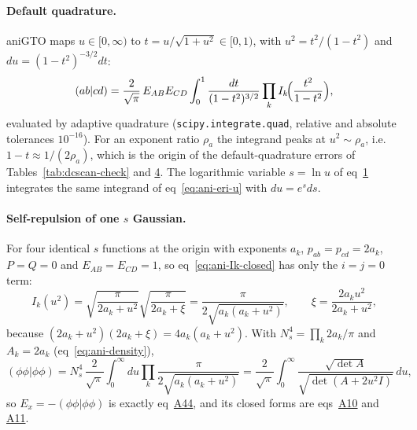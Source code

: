 \documentclass[journal=jctcce,manuscript=suppinfo]{achemso}
\begin{document}
\paragraph{Default quadrature.}  aniGTO maps $u\in[0,\infty)$ to
$t=u/\sqrt{1+u^2}\in[0,1)$, with $u^2=t^2/(1-t^2)$ and
$du=(1-t^2)^{-3/2}dt$:
\begin{equation}
(ab|cd)=\frac{2}{\sqrt\pi}\,E_{AB}E_{CD}\int_0^1\frac{dt}{(1-t^2)^{3/2}}
\prod_kI_k\!\Bigl(\frac{t^2}{1-t^2}\Bigr),
\label{eq:ani-eri-t}
\end{equation}
evaluated by adaptive quadrature (\texttt{scipy.integrate.quad}, relative and
absolute tolerances $10^{-16}$).  For an exponent ratio $\rho_a$ the integrand
peaks at $u^2\sim\rho_a$, i.e.\ $1-t\approx1/(2\rho_a)$, which is the origin of
the default-quadrature errors of Tables~\ref{tab:dcscan-check} and
\href{main.pdf\#table.4}{4}.  The logarithmic variable $s=\ln u$ of
eq~\href{main.pdf\#equation.1}{1} integrates the same integrand of
eq~\ref{eq:ani-eri-u} with $du=e^{s}ds$.

\paragraph{Self-repulsion of one $s$ Gaussian.}  For four identical $s$
functions at the origin with exponents $a_k$, $p_{ab}=p_{cd}=2a_k$, $P=Q=0$
and $E_{AB}=E_{CD}=1$, so eq~\ref{eq:ani-Ik-closed} has only the $i=j=0$ term:
\begin{equation}
I_k(u^2)=\sqrt{\frac{\pi}{2a_k+u^2}}\sqrt{\frac{\pi}{2a_k+\xi}}
=\frac{\pi}{2\sqrt{a_k(a_k+u^2)}},\qquad \xi=\frac{2a_ku^2}{2a_k+u^2},
\label{eq:ani-Ik-s}
\end{equation}
because $(2a_k+u^2)(2a_k+\xi)=4a_k(a_k+u^2)$.  With $N_s^4=\prod_k2a_k/\pi$
and $A_k=2a_k$ (eq~\ref{eq:ani-density}),
\begin{equation}
(\phi\phi|\phi\phi)=N_s^4\,\frac{2}{\sqrt\pi}\int_0^\infty du\prod_k\frac{\pi}{2\sqrt{a_k(a_k+u^2)}}
=\frac{2}{\sqrt\pi}\int_0^\infty\frac{\sqrt{\det A}}{\sqrt{\det(A+2u^2I)}}\,du,
\label{eq:ani-selfrep}
\end{equation}
so $E_x=-(\phi\phi|\phi\phi)$ is exactly eq~\href{main.pdf\#equation.44}{A44}, and its closed
forms are eqs~\href{main.pdf\#equation.10}{A10} and \href{main.pdf\#equation.11}{A11}.
\end{document}
